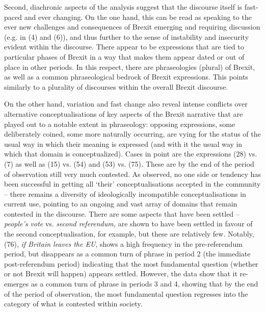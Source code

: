 \documentclass[12pt]{article}
\newenvironment{styleStandard}{\setlength\leftskip{0cm}\setlength\rightskip{0cm plus 1fil}\setlength\parindent{0cm}\setlength\parfillskip{0pt plus 1fil}\setlength\parskip{0in plus 1pt}\writerlistparindent\writerlistleftskip\leavevmode\normalfont\normalsize\writerlistlabel\ignorespaces}{\unskip\vspace{0.111in plus 0.0111in}\par}
\newcommand\writerlistleftskip{}
\newcommand\writerlistparindent{}
\newcommand\writerlistlabel{}
\begin{document}
\begin{styleStandard}
Second, diachronic aspects of the analysis suggest that the discourse itself is fast-paced and ever changing. On the one hand, this can be read as speaking to the ever new challenges and consequences of Brexit emerging and requiring discussion (e.g. in (4) and (6)), and thus further to the sense of instability and insecurity evident within the discourse. There appear to be expressions that are tied to particular phases of Brexit in a way that makes them appear dated or out of place in other periods. In this respect, there are phraseologies (plural) of Brexit, as well as a common phraseological bedrock of Brexit expressions. This points similarly to a plurality of discourses within the overall Brexit discourse.
\end{styleStandard}

\begin{styleStandard}
On the other hand, variation and fast change also reveal intense conflicts over alternative conceptualisations of key aspects of the Brexit narrative that are played out to a notable extent in phraseology: opposing expressions, some deliberately coined, some more naturally occurring, are vying for the status of the usual way in which their meaning is expressed (and with it the usual way in which that domain is conceptualized). Cases in point are the expressions (28) vs. (7) as well as (15)\textit{ }vs. (54) and (53) vs. (75)\textit{. }These are by the end of the period of observation still very much contested. As observed, no one side or tendency has been successful in getting all ‘their’ conceptualisations accepted in the community – there remains a diversity of ideologically incompatible conceptualisations in current use, pointing to an ongoing and vast array of domains that remain contested in the discourse. There are some aspects that have been settled –\textit{ people’s vote} vs. \textit{second referendum,} are shown to have been settled in favour of the second conceptualisation, for example, but these are relatively few. Notably, (76), \textit{if Britain leaves the EU}, shows a high frequency in the pre-referendum period, but disappears as a common turn of phrase in period 2 (the immediate post-referendum period) indicating that the most fundamental question (whether or not Brexit will happen) appears settled. However, the data show that it re-emerges as a common turn of phrase in periods 3 and 4, showing that by the end of the period of observation, the most fundamental question regresses into the category of what is contested within society.
\end{styleStandard}
\end{document}

